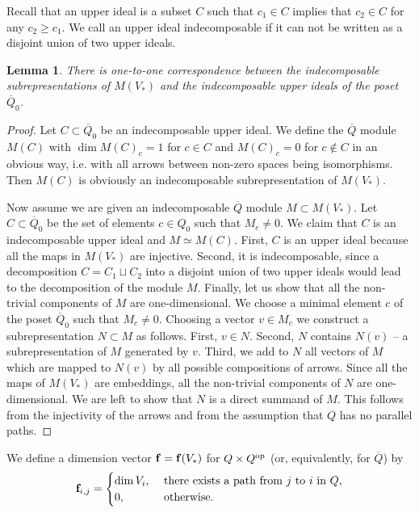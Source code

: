 \documentclass[12pt,a4paper]{amsart}
\numberwithin{equation}{section}
\newtheorem{lem}[thm]{Lemma}
\theoremstyle{remark}
\begin{document}
Recall that an upper ideal is a subset $C$ such that $c_1\in C$ implies that $c_2\in C$ for 
any $c_2\ge c_1$. We call an upper ideal indecomposable if it can not be written as a disjoint
union of two upper ideals.

\begin{lem}
There is one-to-one correspondence between the indecomposable subrepresentations of 
$M(V_*)$ and the indecomposable upper ideals of the poset $\overline Q_0$.
\end{lem}
\begin{proof}
Let $C\subset \overline Q_0$ be an indecomposable upper ideal. 
We define the $\overline Q$ module $M(C)$ with $\dim M(C)_c=1$
for $c\in C$ and $M(C)_c=0$ for $c\notin C$ in an obvious way, i.e. with all arrows
between non-zero spaces being isomorphisms. Then $M(C)$ is obviously an indecomposable subrepresentation of $M(V_*)$.

Now assume we are given an indecomposable $\overline Q$ module $M\subset M(V_*)$. Let $C\subset \overline Q_0$ be the set of  
elements $c\in Q_0$ such that $M_c\ne 0$. We claim that 
$C$ is an indecomposable upper ideal and $M\simeq M(C)$.  
First, $C$ is an upper ideal because all the maps in $M(V_*)$ are injective. 
Second, it is indecomposable, since a decomposition $C=C_1\sqcup C_2$
into a disjoint union of two upper ideals would lead to the decomposition of the module $M$.
Finally, let us show that all the non-trivial components of $M$ are one-dimensional. 
We choose a minimal element $c$ of the poset $\overline Q_0$ such that $M_c\ne 0$.
Choosing a vector $v\in M_c$ we construct a subrepresentation $N\subset M$ as follows.
First,  $v\in N$. Second, $N$ contains $N(v)$ -- a subrepresentation of $M$ generated by $v$. 
Third, we add to $N$ all vectors of $M$ which are mapped to $N(v)$ by all possible compositions
of arrows. Since all the maps of $M(V_*)$ are embeddings, all the non-trivial components of $N$
are one-dimensional. We are left to show that $N$ is a direct summand of $M$. This follows
from the injectivity of the arrows and from the assumption that $Q$ has no parallel paths. 
\end{proof}


We define a dimension vector ${\bf f}={\bf f}(V_*)$ for $Q\times Q^{\rm op}$ 
(or, equivalently, for $\overline Q$) by
$${\bf f}_{i,j}=\begin{cases}
\dim V_i,  &    \text{ there exists a path from $j$ to $i$ in $Q$},\\
0, & \text{ otherwise}.
\end{cases}
$$
\end{document}
